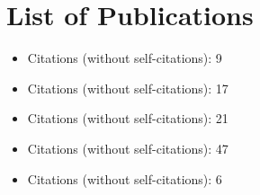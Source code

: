 \chapter*{List of Publications}



\noindent{}
\begin{itemize}[noitemsep,topsep=0pt]

    \item Citations (without self-citations): 9
\end{itemize}\vspace{.5\baselineskip}

\noindent{}
\begin{itemize}[noitemsep,topsep=0pt]
    \item Citations (without self-citations): 17

\end{itemize}\vspace{.5\baselineskip}

\noindent{}
\begin{itemize}[noitemsep,topsep=0pt]
    \item Citations (without self-citations): 21

\end{itemize}\vspace{.5\baselineskip}

\noindent{}
\begin{itemize}[noitemsep,topsep=0pt]
    \item Citations (without self-citations): 47

\end{itemize}\vspace{.5\baselineskip}


\noindent{}
\begin{itemize}[noitemsep,topsep=0pt]
    \item Citations (without self-citations): 6

\end{itemize}\vspace{.5\baselineskip}


